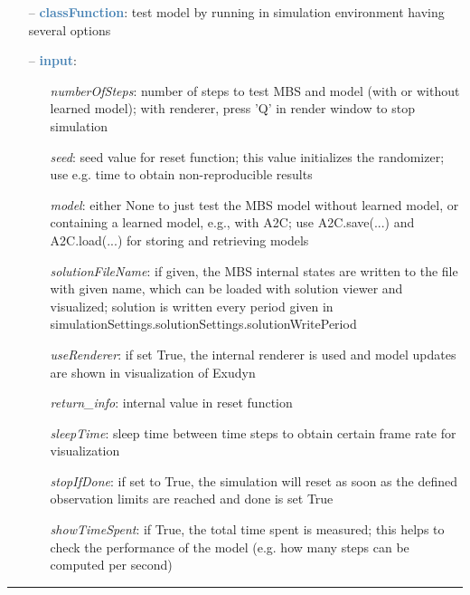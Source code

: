\begin{itemize}[leftmargin=1.4cm]
\begin{flushleft}
\end{flushleft}
\setlength{\itemindent}{0.7cm}
\begin{itemize}[leftmargin=0.7cm]
  \item[--]  \textcolor{steelblue}{\bf classFunction}: test model by running in simulation environment having several options  \item[--]  \textcolor{steelblue}{\bf input}: \vspace{-6pt}
  \begin{itemize}[leftmargin=1.2cm]
\setlength{\itemindent}{-0.7cm}
    \item[] {\it numberOfSteps}: number of steps to test MBS and model (with or without learned model); with renderer, press 'Q' in render window to stop simulation
    \item[] {\it   seed}: seed value for reset function; this value initializes the randomizer; use e.g. time to obtain non-reproducible results
    \item[] {\it   model}: either None to just test the MBS model without learned model, or containing a learned model, e.g., with A2C; use A2C.save(...) and A2C.load(...) for storing and retrieving models
    \item[] {\it   solutionFileName}: if given, the MBS internal states are written to the file with given name, which can be loaded with solution viewer and visualized; solution is written every period given in simulationSettings.solutionSettings.solutionWritePeriod
    \item[] {\it   useRenderer}: if set True, the internal renderer is used and model updates are shown in visualization of Exudyn
    \item[] {\it   return\_info}: internal value in reset function
    \item[] {\it   sleepTime}: sleep time between time steps to obtain certain frame rate for visualization
    \item[] {\it   stopIfDone}: if set to True, the simulation will reset as soon as the defined observation limits are reached and done is set True
    \item[] {\it   showTimeSpent}: if True, the total time spent is measured; this helps to check the performance of the model (e.g. how many steps can be computed per second)
  \end{itemize}
\vspace{12pt}\end{itemize}
%
\noindent\rule{8cm}{0.75pt}\vspace{1pt} \\ 

\end{itemize}
